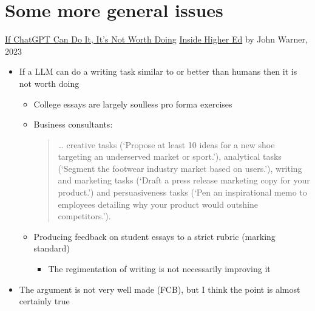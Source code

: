 \documentclass[25pt,a4paper,landscape,headrule,footrule,xetex]{foils}
\begin{document}
\section{Some more general issues}
  



\href{https://www.insidehighered.com/opinion/blogs/just-visiting/2023/09/20/chatgpt-shows-way-toward-our-own-humanity}{If ChatGPT Can Do It, It’s Not Worth Doing}
\href{https://www.insidehighered.com/}{Inside Higher Ed} by  John Warner,  2023

\begin{itemize}
\item If a LLM can do a writing task similar to or better than humans
  then it is not worth doing
  \begin{itemize}
  \item College essays are largely soulless pro forma exercises
  \item Business consultants:
    \begin{quote}
      … creative tasks (‘Propose at least 10 ideas for a new shoe targeting an underserved market or sport.’), analytical tasks (‘Segment the footwear industry market based on users.’), writing and marketing tasks (‘Draft a press release marketing copy for your product.’) and persuasiveness tasks (‘Pen an inspirational memo to employees detailing why your product would outshine competitors.’).
    \end{quote}
    
  \item Producing feedback on student essays to a strict rubric
    (marking standard)
    \begin{itemize}
    \item The regimentation of writing is not necessarily improving it
    \end{itemize}
  \end{itemize}
\item The argument is not very well made (FCB), but I think the point is almost certainly true
\end{itemize}


\end{document}
